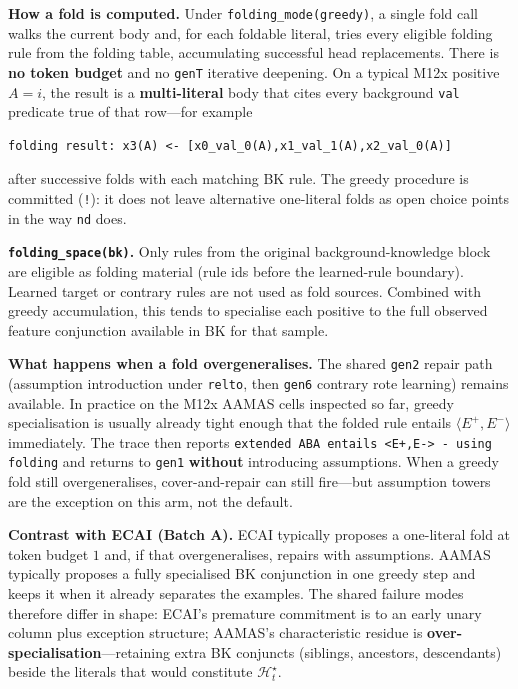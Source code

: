 \documentclass[11pt]{article}
\begin{document}
\textbf{How a fold is computed.} Under \texttt{folding\_mode(greedy)}, a single fold call walks the current body and, for each foldable literal, tries every eligible folding rule from the folding table, accumulating successful head replacements. There is \textbf{no token budget} and no \texttt{genT} iterative deepening. On a typical M12x positive \(A=i\), the result is a \textbf{multi-literal} body that cites every background \texttt{val} predicate true of that row---for example

\begin{lstlisting}[style=logic]
folding result: x3(A) <- [x0_val_0(A),x1_val_1(A),x2_val_0(A)]
\end{lstlisting}

after successive folds with each matching BK rule. The greedy procedure is committed (\texttt{!}): it does not leave alternative one-literal folds as open choice points in the way \texttt{nd} does.

\textbf{\texttt{folding\_space(bk)}.} Only rules from the original background-knowledge block are eligible as folding material (rule ids before the learned-rule boundary). Learned target or contrary rules are not used as fold sources. Combined with greedy accumulation, this tends to specialise each positive to the full observed feature conjunction available in BK for that sample.

\textbf{What happens when a fold overgeneralises.} The shared \texttt{gen2} repair path (assumption introduction under \texttt{relto}, then \texttt{gen6} contrary rote learning) remains available. In practice on the M12x AAMAS cells inspected so far, greedy specialisation is usually already tight enough that the folded rule entails \(\langle E^+,E^-\rangle\) immediately. The trace then reports \texttt{extended ABA entails <E+,E-> - using folding} and returns to \texttt{gen1} \textbf{without} introducing assumptions. When a greedy fold still overgeneralises, cover-and-repair can still fire---but assumption towers are the exception on this arm, not the default.

\textbf{Contrast with ECAI (Batch A).} ECAI typically proposes a one-literal fold at token budget \(1\) and, if that overgeneralises, repairs with assumptions. AAMAS typically proposes a fully specialised BK conjunction in one greedy step and keeps it when it already separates the examples. The shared failure modes therefore differ in shape: ECAI's premature commitment is to an early unary column plus exception structure; AAMAS's characteristic residue is \textbf{over-specialisation}---retaining extra BK conjuncts (siblings, ancestors, descendants) beside the literals that would constitute \(\mathcal{H}_t^\star\).
\end{document}

